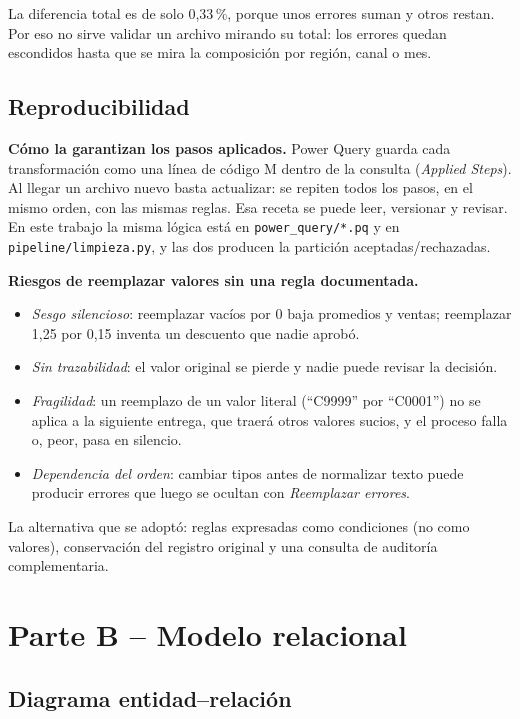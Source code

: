\documentclass[11pt,letterpaper]{article}
\begin{document}
La diferencia total es de solo 0,33\,\%, porque unos errores suman y otros restan. Por eso no sirve validar un
archivo mirando su total: los errores quedan escondidos hasta que se mira la composición por región, canal o mes.

\subsection{Reproducibilidad}

\textbf{Cómo la garantizan los pasos aplicados.} Power Query guarda cada transformación como una línea de código M
dentro de la consulta (\emph{Applied Steps}). Al llegar un archivo nuevo basta actualizar: se repiten todos los pasos,
en el mismo orden, con las mismas reglas. Esa receta se puede leer, versionar y revisar. En este trabajo la misma
lógica está en \texttt{power\_query/*.pq} y en \texttt{pipeline/limpieza.py}, y las dos producen la partición
aceptadas/rechazadas.

\textbf{Riesgos de reemplazar valores sin una regla documentada.}
\begin{itemize}
  \item \emph{Sesgo silencioso}: reemplazar vacíos por 0 baja promedios y ventas; reemplazar 1,25 por 0,15
        inventa un descuento que nadie aprobó.
  \item \emph{Sin trazabilidad}: el valor original se pierde y nadie puede revisar la decisión.
  \item \emph{Fragilidad}: un reemplazo de un valor literal (``C9999'' por ``C0001'') no se aplica a la siguiente
        entrega, que traerá otros valores sucios, y el proceso falla o, peor, pasa en silencio.
  \item \emph{Dependencia del orden}: cambiar tipos antes de normalizar texto puede producir errores que
        luego se ocultan con \emph{Reemplazar errores}.
\end{itemize}
La alternativa que se adoptó: reglas expresadas como condiciones (no como valores), conservación del registro
original y una consulta de auditoría complementaria.

\section{Parte B -- Modelo relacional}

\subsection{Diagrama entidad--relación}
\end{document}
